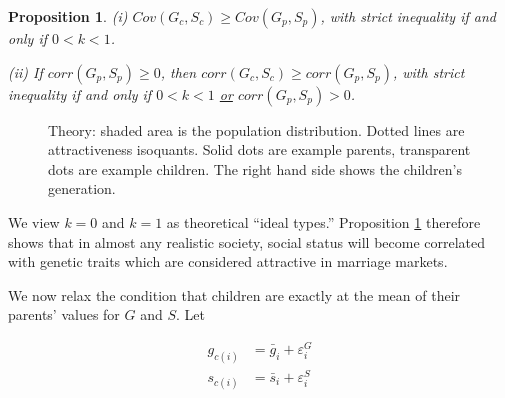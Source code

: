 \documentclass[
]{article}
\newtheorem{prop}{Proposition}
\begin{document}
\begin{prop}
\label{prop:prop1}
(i) $Cov(G_{c}, S_{c}) \ge Cov(G_{p},S_{p})$, with strict inequality
if and only if $0 < k < 1$. 

(ii) If $corr(G_{p}, S_{p}) \ge 0$, then $corr(G_{c},S_{c}) \ge corr(G_{p},S_{p})$,
with strict inequality if and only if $0 < k < 1$ \uline{or} 
$corr(G_{p}, S_{p}) > 0$.
\end{prop}

\begin{figure}

{\centering {}\newline{}\newline{}

}

\caption{Theory: shaded area is the population distribution. Dotted lines are attractiveness isoquants. Solid dots are example parents, transparent dots are example children. The right hand side shows the children's generation.}\label{fig:pic-intuition}
\end{figure}

We view \(k = 0\) and \(k = 1\) as theoretical ``ideal types.'' Proposition
\ref{prop:prop1} therefore shows that in almost any realistic society,
social status will become correlated with genetic traits which are
considered attractive in marriage markets.

We now relax the condition that children are exactly at the mean of
their parents' values for \(G\) and \(S\). Let

\begin{align*}
g_{c(i)} & = \bar{g}_{i}+\varepsilon_{i}^{G} \\
s_{c(i)} & = \bar{s}_{i}+\varepsilon_{i}^{S}
\end{align*}
\end{document}
